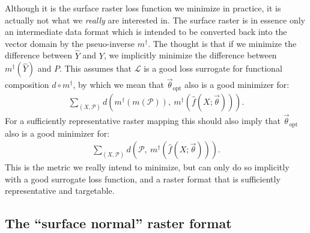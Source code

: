 Although it is the surface raster loss function we minimize in practice, it is actually not what we \emph{really} are interested in.
The surface raster is in essence only an intermediate data format which is intended to be converted back into the vector domain by the pseuo-inverse $m^{\dagger}$.
The thought is that if we minimize the difference between $\hat{Y}$ and $Y$, we implicitly minimize the difference between $m^{\dagger}(\hat{Y})$ and $P$.
This assumes that $\mathcal{L}$ is a good loss surrogate for functional composition $d \circ m^{\dagger}$, by which we mean that $\vec{\theta}_{\mathrm{opt}}$ also is a good minimizer for:
\begin{align*}
  \sum_{(X, \mathcal{P})}
  d\left(
    m^{\dagger}(m(\mathcal{P})),~
    m^{\dagger}(\hat{f}(X; \vec{\theta}))
  \right).
\end{align*}
For a sufficiently representative raster mapping this should also imply that $\vec{\theta}_{\mathrm{opt}}$ also is a good minimizer for:
\begin{align*}
  \sum_{(X, \mathcal{P})}
  d\left(
    \mathcal{P},~
    m^{\dagger}(\hat{f}(X; \vec{\theta}))
  \right).
\end{align*}
This is the metric we really intend to minimize, but can only do so implicitly with a good surrogate loss function, and a raster format that is sufficiently representative and targetable.

\subsection{The \enquote{surface normal} raster format}

